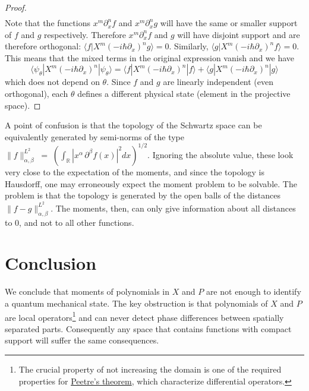 \documentclass{techbrief}
\begin{document}
\begin{proof}
\begin{equation}
\begin{split}
        \end{split}
    \end{equation}
    Note that the functions $x^m \partial_x^n f$ and $x^m \partial_x^n g$ will have the same or smaller support of $f$ and $g$ respectively. Therefore $x^m \partial_x^n f$ and $g$ will have disjoint support and are therefore orthogonal: $\langle f | X^m (-i \hbar \partial_x)^n g \rangle = 0$. Similarly, $\langle g | X^m (-i \hbar \partial_x)^n f \rangle = 0$. This means that the mixed terms in the original expression vanish and we have
    \begin{equation}
        \langle \psi_\theta | X^m (-i \hbar \partial_x)^n | \psi_\theta \rangle = \langle f  | X^m (-i \hbar \partial_x)^n | f \rangle + \langle g | X^m (-i \hbar \partial_x)^n | g \rangle
    \end{equation}
    which does not depend on $\theta$. Since $f$ and $g$ are linearly independent (even orthogonal), each $\theta$ defines a different physical state (element in the projective space).
\end{proof}

\begin{remark}
A point of confusion is that the topology of the Schwartz space can be equivalently generated by semi-norms of the type $\|f\|_{\alpha,\beta}^{L^2} \;=\; \left( \int_{\mathbb{R}}
\left| x^\alpha \, \partial^\beta f(x) \right|^2 dx
\right)^{1/2}$. Ignoring the absolute value, these look very close to the expectation of the moments, and since the topology is Hausdorff, one may erroneously expect the moment problem to be solvable. The problem is that the topology is generated by the open balls of the distances $\|f - g\|_{\alpha,\beta}^{L^2}$. The moments, then, can only give information about all distances to 0, and not to all other functions.
\end{remark}

\section{Conclusion}
We conclude that moments of polynomials in $X$ and $P$ are not enough to identify a quantum mechanical state. The key obstruction is that polynomials of $X$ and $P$ are local operators\footnote{The crucial property of not increasing the domain is one of the required properties for \href{https://en.wikipedia.org/wiki/Peetre_theorem}{Peetre's theorem}, which characterize differential operators.} and can never detect phase differences between spatially separated parts. Consequently any space that contains functions with compact support will suffer the same consequences.
\end{document}
